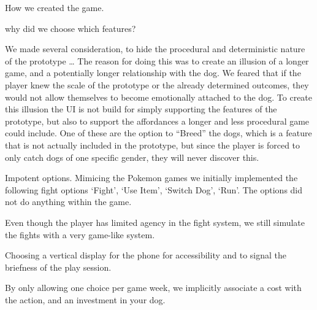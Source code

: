 How we created the game.

why did we choose which features?

We made several consideration, to hide the procedural and deterministic nature of the prototype …
The reason for doing this was to create an illusion of a longer game, and a potentially longer relationship with the dog. We feared that if the player knew the scale of the prototype or the already determined outcomes, they would not allow themselves to become emotionally attached to the dog.
To create this illusion the UI is not build for simply supporting the features of the prototype, but also to support the affordances a longer and less procedural game could include. One of these are the option to “Breed” the dogs, which is a feature that is not actually included in the prototype, but since the player is forced to only catch dogs of one specific gender, they will never discover this.

Impotent options. Mimicing the Pokemon games we initially implemented the following fight options ‘Fight’, ‘Use Item’, ‘Switch Dog’, ‘Run’. The options did not do anything within the game.

Even though the player has limited agency in the fight system, we still simulate the fights with a very game-like system.


Choosing a vertical display for the phone for accessibility and to signal the briefness of the play session.

By only allowing one choice per game week, we implicitly associate a cost with the action, and an investment in your dog.
